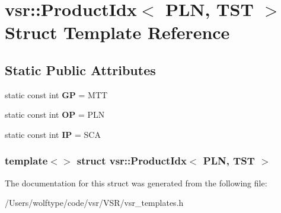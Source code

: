 \hypertarget{structvsr_1_1_product_idx_3_01_p_l_n_00_01_t_s_t_01_4}{\section{vsr\-:\-:Product\-Idx$<$ P\-L\-N, T\-S\-T $>$ Struct Template Reference}
\label{structvsr_1_1_product_idx_3_01_p_l_n_00_01_t_s_t_01_4}
}
\subsection*{Static Public Attributes}
\begin{DoxyCompactItemize}
\item 
\hypertarget{structvsr_1_1_product_idx_3_01_p_l_n_00_01_t_s_t_01_4_a9b42fc1bcdb5a67c00551d69228ddcb5}{static const int {\bfseries G\-P} = M\-T\-T}\label{structvsr_1_1_product_idx_3_01_p_l_n_00_01_t_s_t_01_4_a9b42fc1bcdb5a67c00551d69228ddcb5}

\item 
\hypertarget{structvsr_1_1_product_idx_3_01_p_l_n_00_01_t_s_t_01_4_ad5887417fa18bf7fa2fbb4ddcadca88a}{static const int {\bfseries O\-P} = P\-L\-N}\label{structvsr_1_1_product_idx_3_01_p_l_n_00_01_t_s_t_01_4_ad5887417fa18bf7fa2fbb4ddcadca88a}

\item 
\hypertarget{structvsr_1_1_product_idx_3_01_p_l_n_00_01_t_s_t_01_4_adc4dd361c3ab5734dc29a1d90868b6c4}{static const int {\bfseries I\-P} = S\-C\-A}\label{structvsr_1_1_product_idx_3_01_p_l_n_00_01_t_s_t_01_4_adc4dd361c3ab5734dc29a1d90868b6c4}

\end{DoxyCompactItemize}
\subsubsection*{template$<$$>$ struct vsr\-::\-Product\-Idx$<$ P\-L\-N, T\-S\-T $>$}



The documentation for this struct was generated from the following file\-:\begin{DoxyCompactItemize}
\item 
/\-Users/wolftype/code/vsr/\-V\-S\-R/vsr\-\_\-templates.\-h\end{DoxyCompactItemize}
